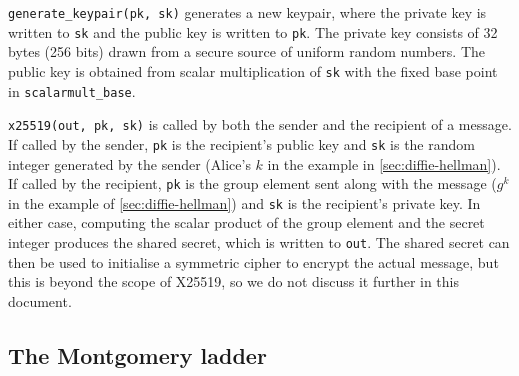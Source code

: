 \documentclass[manuscript]{acmart}
\begin{document}
\verb|generate_keypair(pk, sk)| generates a new keypair, where the private key is written to \verb|sk| and the public key is written to \verb|pk|.
The private key consists of 32 bytes (256 bits) drawn from a secure source of uniform random numbers.
The public key is obtained from scalar multiplication of \verb|sk| with the fixed base point in \verb|scalarmult_base|.

\verb|x25519(out, pk, sk)| is called by both the sender and the recipient of a message.
If called by the sender, \verb|pk| is the recipient's public key and \verb|sk| is the random integer generated by the sender (Alice's $k$ in the example in \autoref{sec:diffie-hellman}).
If called by the recipient, \verb|pk| is the group element sent along with the message ($g^k$ in the example of \autoref{sec:diffie-hellman}) and \verb|sk| is the recipient's private key.
In either case, computing the scalar product of the group element and the secret integer produces the shared secret, which is written to \verb|out|.
The shared secret can then be used to initialise a symmetric cipher to encrypt the actual message, but this is beyond the scope of X25519, so we do not discuss it further in this document.

\subsection{The Montgomery ladder}\label{sec:ladder}
\end{document}
